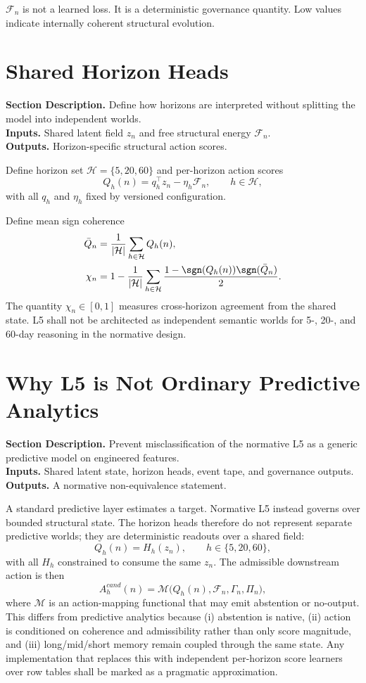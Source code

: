 \documentclass[11pt]{report}
\newcommand{\meta}[3]{\textbf{Section Description.} #1\\
\textbf{Inputs.} #2\\
\textbf{Outputs.} #3\par}
\begin{document}
$\mathcal{F}_n$ is not a learned loss. It is a deterministic governance quantity. Low values indicate internally coherent structural evolution.

\section{Shared Horizon Heads}
\meta{Define how horizons are interpreted without splitting the model into independent worlds.}{Shared latent field $z_n$ and free structural energy $\mathcal{F}_n$.}{Horizon-specific structural action scores.}

Define horizon set $\mathcal{H}=\{5,20,60\}$ and per-horizon action scores
\[
Q_h(n)=q_h^{\top}z_n - \eta_h\mathcal{F}_n,\qquad h\in\mathcal{H},
\]
with all $q_h$ and $\eta_h$ fixed by versioned configuration.

Define mean sign coherence
\begin{align*}
\bar Q_n &= \frac{1}{|\mathcal{H}|}\sum_{h\in\mathcal{H}}Q_h(n),\\
\chi_n &= 1-\frac{1}{|\mathcal{H}|}\sum_{h\in\mathcal{H}}\frac{1-\sgn(Q_h(n))\sgn(\bar Q_n)}{2}.
\end{align*}
The quantity $\chi_n\in[0,1]$ measures cross-horizon agreement from the shared state. L5 shall not be architected as independent semantic worlds for 5-, 20-, and 60-day reasoning in the normative design.


\section{Why L5 is Not Ordinary Predictive Analytics}
\meta{Prevent misclassification of the normative L5 as a generic predictive model on engineered features.}{Shared latent state, horizon heads, event tape, and governance outputs.}{A normative non-equivalence statement.}

A standard predictive layer estimates a target. Normative L5 instead governs over bounded structural state. The horizon heads therefore do not represent separate predictive worlds; they are deterministic readouts over a shared field:
\[
Q_h(n)=H_h(z_n),\qquad h\in\{5,20,60\},
\]
with all $H_h$ constrained to consume the same $z_n$. The admissible downstream action is then
\[
A_h^{cand}(n)=\mathcal{M}\big(Q_h(n),\mathcal{F}_n,\Gamma_n,\Pi_n\big),
\]
where $\mathcal{M}$ is an action-mapping functional that may emit abstention or no-output. This differs from predictive analytics because (i) abstention is native, (ii) action is conditioned on coherence and admissibility rather than only score magnitude, and (iii) long/mid/short memory remain coupled through the same state. Any implementation that replaces this with independent per-horizon score learners over row tables shall be marked as a pragmatic approximation.
\end{document}
